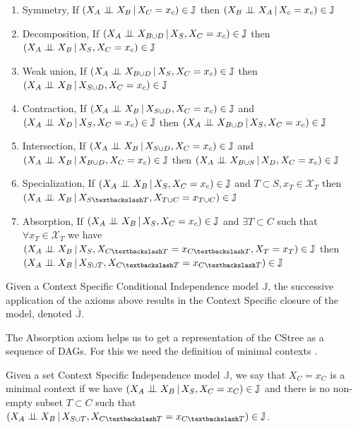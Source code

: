 \documentclass{tufte-book}
\begin{document}
\begin{enumerate}
\item Symmetry, If \((X_A \perp \!\!\! \perp X_B \,|\, X_C=x_c) \in \mathbb{J}\) then \((X_B \perp \!\!\! \perp X_A \,|\, X_c=x_c) \in \mathbb{J}\)
\item Decomposition, If \((X_A \perp \!\!\! \perp X_{B \cup D} \,|\, X_S, X_C=x_c) \in \mathbb{J}\) then \((X_A \perp \!\!\! \perp X_B \,|\, X_S, X_C=x_c) \in \mathbb{J}\)
\item Weak union, If \((X_A \perp \!\!\! \perp X_{B \cup D} \,|\, X_S, X_C=x_c) \in \mathbb{J}\) then \((X_A \perp \!\!\! \perp X_{B} \,|\, X_{S \cup D}, X_C=x_c) \in \mathbb{J}\)
\item Contraction, If \((X_A \perp \!\!\! \perp X_B \,|\, X_{S \cup D}, X_C=x_c) \in \mathbb{J}\) and \((X_A \perp \!\!\! \perp X_D \,|\,X_S, X_C=x_c) \in \mathbb{J}\) then \((X_A \perp \!\!\! \perp X_{B \cup D} \,|\, X_S, X_C=x_c) \in \mathbb{J}\)
\item Intersection,  If \((X_A \perp \!\!\! \perp X_B \,|\, X_{S \cup D}, X_C=x_c) \in \mathbb{J}\) and  \((X_A \perp \!\!\! \perp X_B \,|\, X_{B \cup D}, X_C=x_c) \in \mathbb{J}\) then  \((X_A \perp \!\!\! \perp X_{B \cup S} \,|\, X_D, X_C=x_c) \in \mathbb{J}\)
\item Specialization, If \((X_A \perp \!\!\! \perp X_B \,|\, X_S, X_C=x_c) \in \mathbb{J}\) and \(T \subset S, x_T \in \mathcal{X}_T\) then \((X_A \indep X_B \,|\, X_{S \textbackslash T}, X_{T \cup C} = x_{T \cup C}) \in \mathbb{J}\)
\item Absorption, If \((X_A \perp \!\!\! \perp X_B \,|\, X_S, X_C=x_c) \in \mathbb{J}\) and \(\exists T \subset C\) such that \(\forall x_T \in \mathcal{X}_T\) we have \((X_A \indep X_B \,|\, X_S, X_{C\textbackslash T}=x_{C \textbackslash T}, X_T=x_T) \in \mathbb{J}\) then \((X_A \indep X_B \,|\, X_{S \cup T}, X_{C \textbackslash T}=x_{C \textbackslash T}) \in \mathbb{J}\)
\end{enumerate}


Given a Context Specific Conditional Independence model \(\mathbb{J}\), the successive application of the axioms above results in the Context Specific closure  of the model, denoted \(\mathbb{\overline{J}}\).


The Absorption axiom helps us to get a representation of the CStree as a sequence of DAGs. For this we need the definition of minimal contexts \cite{duarte-2021-repres-learn}.
\begin{definition}\label{def:mcs}
Given a set Context Specific Independence model $\mathbb{J}$, we say that ${X_C=x_C}$ is a minimal context if we have $(X_A  \perp \!\!\! \perp X_B \,|\, X_S, X_C=x_C) \in \mathbb{J}$ and there is no non-empty subset $T \subset C$ such that $(X_A \indep X_B \,|\, X_{S \cup T}, X_{C \textbackslash T}=x_{C\textbackslash T}) \in \mathbb{J}$.
\end{definition}
\end{document}
